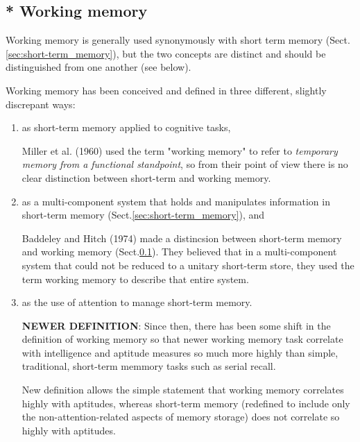 \subsection{* Working memory}
\label{sec:working-memory}

Working memory is generally used synonymously with short term
memory (Sect.\ref{sec:short-term_memory}), but the two concepts are distinct
and should be distinguished from one another (see below).

Working memory has been conceived and defined in three different, slightly
discrepant ways: 
\begin{enumerate}
  \item as short-term memory applied to cognitive tasks, 

Miller et al. (1960) used the term "working memory" to refer to {\it temporary
memory from a functional standpoint}, so from their point of view there is no
clear distinction between short-term and working memory.


  \item as a multi-component system that holds and manipulates information in
  short-term memory (Sect.\ref{sec:short-term_memory}), and 

Baddeley and Hitch (1974) made a distincsion between short-term memory and
working memory (Sect.\ref{sec:working-memory}). They believed that in a
multi-component system that could not be reduced to a unitary short-term store,
they used the term working memory to describe that entire system.
  
  \item as the use of attention to manage short-term memory.

{\bf NEWER DEFINITION}: Since then, there has been some shift in the definition
of working memory so that newer working memory task correlate with intelligence
and aptitude measures so much more highly than simple, traditional, short-term
memmory tasks such as serial recall.

New definition allows the simple statement that working memory correlates highly
with aptitudes, whereas short-term memory (redefined to include only the
non-attention-related aspects of memory storage) does not correlate so highly
with aptitudes.
\end{enumerate}

  

